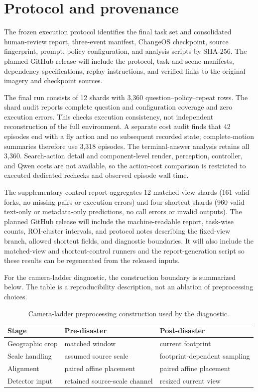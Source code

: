 \section{Protocol and provenance}
\label{app:provenance}
The frozen execution protocol identifies the final task set and consolidated human-review report, three-event manifest, ChangeOS checkpoint, source fingerprint, prompt, policy configuration, and analysis scripts by SHA-256. The planned GitHub release will include the protocol, task and scene manifests, dependency specifications, replay instructions, and verified links to the original imagery and checkpoint sources.

The final run consists of 12 shards with 3,360 question--policy--repeat rows. The shard audit reports complete question and configuration coverage and zero execution errors. This checks execution consistency, not independent reconstruction of the full environment. A separate cost audit finds that 42 episodes end with a fly action and no subsequent recorded state; complete-motion summaries therefore use 3,318 episodes. The terminal-answer analysis retains all 3,360. Search-action detail and component-level render, perception, controller, and Qwen costs are not available, so the action-cost comparison is restricted to executed dedicated rechecks and observed episode wall time.

The supplementary-control report aggregates 12 matched-view shards (161 valid forks, no missing pairs or execution errors) and four shortcut shards (960 valid text-only or metadata-only predictions, no call errors or invalid outputs). The planned GitHub release will include the machine-readable report, task-wise counts, ROI-cluster intervals, and protocol notes describing the fixed-view branch, allowed shortcut fields, and diagnostic boundaries. It will also include the matched-view and shortcut-control runners and the report-generation script so these results can be regenerated from the released inputs.

For the camera-ladder diagnostic, the construction boundary is summarized below. The table is a reproducibility description, not an ablation of preprocessing choices.
\begin{table}[htbp]
\centering\small
\caption{Camera-ladder preprocessing construction used by the diagnostic.}
\label{tab:preprocessing-construction}
\begin{tabularx}{\linewidth}{@{}lXX@{}}
\toprule
Stage & Pre-disaster & Post-disaster\\
\midrule
Geographic crop & matched window & current footprint\\
Scale handling & assumed source scale & footprint-dependent sampling\\
Alignment & paired affine placement & paired affine placement\\
Detector input & retained source-scale channel & resized current view\\
\bottomrule
\end{tabularx}
\end{table}
